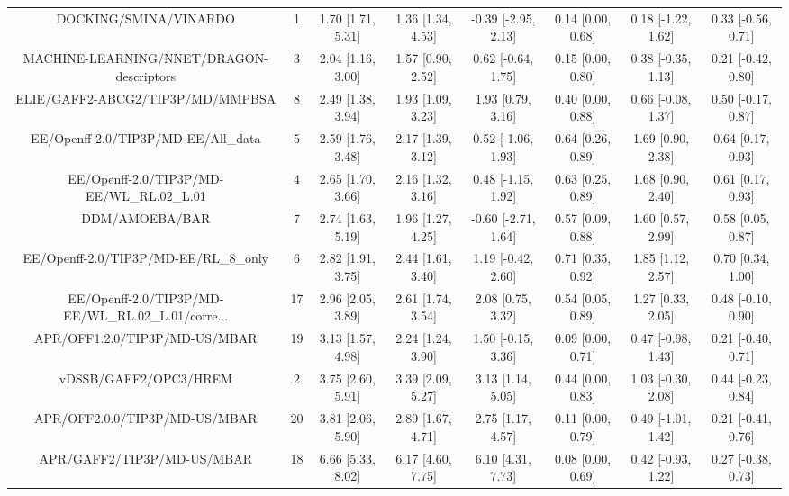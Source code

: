 \documentclass[8pt]{article}
\begin{document}
\begin{center}
\begin{footnotesize}
\begin{longtable}{|cccccccc|}
\bottomrule
\endlastfoot
                             DOCKING/SMINA/VINARDO &   1 & 1.70 [1.71, 5.31] & 1.36 [1.34, 4.53] & -0.39 [-2.95, 2.13] & 0.14 [0.00, 0.68] & 0.18 [-1.22, 1.62] & 0.33 [-0.56, 0.71] \\
          MACHINE-LEARNING/NNET/DRAGON-descriptors &   3 & 2.04 [1.16, 3.00] & 1.57 [0.90, 2.52] &  0.62 [-0.64, 1.75] & 0.15 [0.00, 0.80] & 0.38 [-0.35, 1.13] & 0.21 [-0.42, 0.80] \\
                  ELIE/GAFF2-ABCG2/TIP3P/MD/MMPBSA &   8 & 2.49 [1.38, 3.94] & 1.93 [1.09, 3.23] &   1.93 [0.79, 3.16] & 0.40 [0.00, 0.88] & 0.66 [-0.08, 1.37] & 0.50 [-0.17, 0.87] \\
               EE/Openff-2.0/TIP3P/MD-EE/All\_data &   5 & 2.59 [1.76, 3.48] & 2.17 [1.39, 3.12] &  0.52 [-1.06, 1.93] & 0.64 [0.26, 0.89] &  1.69 [0.90, 2.38] &  0.64 [0.17, 0.93] \\
         EE/Openff-2.0/TIP3P/MD-EE/WL\_RL.02\_L.01 &   4 & 2.65 [1.70, 3.66] & 2.16 [1.32, 3.16] &  0.48 [-1.15, 1.92] & 0.63 [0.25, 0.89] &  1.68 [0.90, 2.40] &  0.61 [0.17, 0.93] \\
                                    DDM/AMOEBA/BAR &   7 & 2.74 [1.63, 5.19] & 1.96 [1.27, 4.25] & -0.60 [-2.71, 1.64] & 0.57 [0.09, 0.88] &  1.60 [0.57, 2.99] &  0.58 [0.05, 0.87] \\
             EE/Openff-2.0/TIP3P/MD-EE/RL\_8\_only &   6 & 2.82 [1.91, 3.75] & 2.44 [1.61, 3.40] &  1.19 [-0.42, 2.60] & 0.71 [0.35, 0.92] &  1.85 [1.12, 2.57] &  0.70 [0.34, 1.00] \\
EE/Openff-2.0/TIP3P/MD-EE/WL\_RL.02\_L.01/corre... &  17 & 2.96 [2.05, 3.89] & 2.61 [1.74, 3.54] &   2.08 [0.75, 3.32] & 0.54 [0.05, 0.89] &  1.27 [0.33, 2.05] & 0.48 [-0.10, 0.90] \\
                     APR/OFF1.2.0/TIP3P/MD-US/MBAR &  19 & 3.13 [1.57, 4.98] & 2.24 [1.24, 3.90] &  1.50 [-0.15, 3.36] & 0.09 [0.00, 0.71] & 0.47 [-0.98, 1.43] & 0.21 [-0.40, 0.71] \\
                             vDSSB/GAFF2/OPC3/HREM &   2 & 3.75 [2.60, 5.91] & 3.39 [2.09, 5.27] &   3.13 [1.14, 5.05] & 0.44 [0.00, 0.83] & 1.03 [-0.30, 2.08] & 0.44 [-0.23, 0.84] \\
                     APR/OFF2.0.0/TIP3P/MD-US/MBAR &  20 & 3.81 [2.06, 5.90] & 2.89 [1.67, 4.71] &   2.75 [1.17, 4.57] & 0.11 [0.00, 0.79] & 0.49 [-1.01, 1.42] & 0.21 [-0.41, 0.76] \\
                        APR/GAFF2/TIP3P/MD-US/MBAR &  18 & 6.66 [5.33, 8.02] & 6.17 [4.60, 7.75] &   6.10 [4.31, 7.73] & 0.08 [0.00, 0.69] & 0.42 [-0.93, 1.22] & 0.27 [-0.38, 0.73] \\
\end{longtable}
\end{footnotesize}
\end{center}
\end{document}
